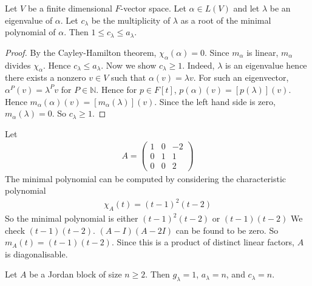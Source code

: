 \begin{lemma}
	Let $V$ be a finite dimensional $F$-vector space.
	Let $\alpha \in L(V)$ and let $\lambda$ be an eigenvalue of $\alpha$.
	Let $c_\lambda$ be the multiplicity of $\lambda$ as a root of the minimal polynomial of $\alpha$.
	Then $1 \leq c_\lambda \leq a_\lambda$.
\end{lemma}
\begin{proof}
	By the Cayley-Hamilton theorem, $\chi_\alpha(\alpha) = 0$.
	Since $m_\alpha$ is linear, $m_\alpha$ divides $\chi_\alpha$.
	Hence $c_\lambda \leq a_\lambda$.
	Now we show $c_\lambda \geq 1$.
	Indeed, $\lambda$ is an eigenvalue hence there exists a nonzero $v \in V$ such that $\alpha(v) = \lambda v$.
	For such an eigenvector, $\alpha^P(v) = \lambda^P v$ for $P \in \mathbb N$.
	Hence for $p \in F[t]$, $p(\alpha)(v) = [p(\lambda)](v)$.
	Hence $m_\alpha(\alpha)(v) = [m_\alpha(\lambda)](v)$.
	Since the left hand side is zero, $m_\alpha(\lambda) = 0$.
	So $c_\lambda \geq 1$.
\end{proof}
\begin{example}
	Let
	\begin{align*}
		A = \begin{pmatrix}
			1 & 0 & -2 \\
			0 & 1 & 1  \\
			0 & 0 & 2
		\end{pmatrix}
	\end{align*}
	The minimal polynomial can be computed by considering the characteristic polynomial
	\begin{align*}
		\chi_A(t) = (t-1)^2(t-2)
	\end{align*}
	So the minimal polynomial is either $(t-1)^2(t-2)$ or $(t-1)(t-2)$
	We check $(t-1)(t-2)$.
	$(A - I)(A - 2I)$ can be found to be zero.
	So $m_A(t) = (t-1)(t-2)$.
	Since this is a product of distinct linear factors, $A$ is diagonalisable.
\end{example}
\begin{example}
	Let $A$ be a Jordan block of size $n \geq 2$.
	Then $g_\lambda = 1$, $a_\lambda = n$, and $c_\lambda = n$.
\end{example}

